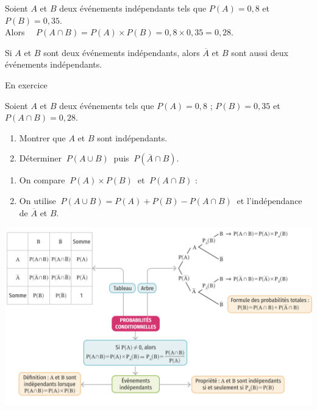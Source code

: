 \documentclass[a4paper,11pt,cours]{nsi} %
\begin{document}
\begin{exemple}[ ]
	Soient $A$ et $B$ deux événements indépendants tels que $P(A)=0,8$ et $P(B)=0,35$.\\
	Alors $\quad P(A\cap B)=P(A)\times P(B)=0,8\times 0,35=0,28$.
\end{exemple}

\begin{propriete}[ ]
	Si $A$ et $B$ sont deux événements indépendants, alors $\overline{A}$ et $B$ sont aussi deux événements indépendants.
\end{propriete}

\begin{demonstration}
	En exercice \\[0.5em]
\end{demonstration}
\begin{exemple}[ d'application]
	Soient $A$ et $B$ deux événements tels que $P(A)=0,8$ ; $P(B)=0,35$ et $P(A\cap B)=0,28$.
	\begin{enumerate}
		\item 	Montrer que $A$ et $B$ sont indépendants.
		\item 	Déterminer $\ P(A\cup B)\ $ puis $\ P(\overline{A} \cap B)$.
	\end{enumerate}
	\begin{methode}[ ]
		\begin{enumerate}
			\item 	On compare $\ P(A)\times P(B)\ $ et $\ P(A\cap B)$ :\\
			\item 	On utilise $\ P(A\cup B)=P(A)+P(B)-P(A\cap B)\ $ et l'indépendance de $\overline{A}$ et $B$.\\
		\end{enumerate}
	\end{methode}
\end{exemple}
\begin{aretenir}
	\includegraphics[width=16.5cm]{cartementale}
\end{aretenir}
\end{document}
